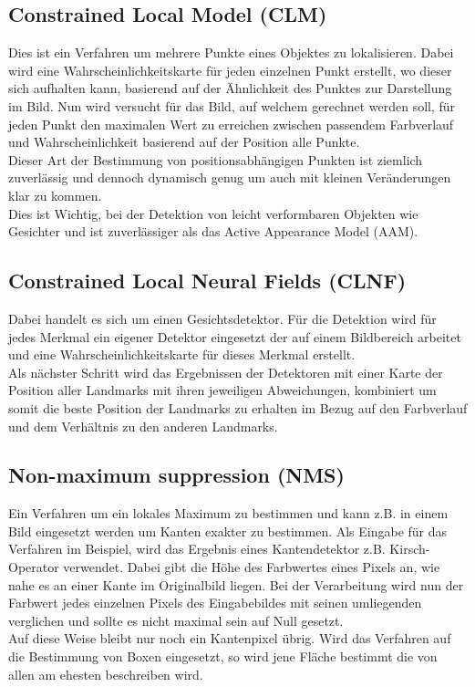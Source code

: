 \subsection{Constrained Local Model (CLM)}
Dies ist ein Verfahren um mehrere Punkte eines Objektes zu lokalisieren. Dabei wird eine Wahrscheinlichkeitskarte für jeden einzelnen Punkt erstellt, wo dieser sich aufhalten kann, basierend auf der Ähnlichkeit des Punktes zur Darstellung im Bild. Nun wird versucht für das Bild, auf welchem gerechnet werden soll, für jeden Punkt den maximalen Wert zu erreichen zwischen passendem Farbverlauf und Wahrscheinlichkeit basierend auf der Position alle Punkte.\\
Dieser Art der Bestimmung von positionsabhängigen Punkten ist ziemlich zuverlässig und dennoch dynamisch genug um auch mit kleinen Veränderungen klar zu kommen.\\
Dies ist Wichtig, bei der Detektion von leicht verformbaren Objekten wie Gesichter und ist zuverlässiger als das Active Appearance Model (AAM).\\
\cite{pdf_CLM}
\subsection{Constrained Local Neural Fields (CLNF)}
Dabei handelt es sich um einen Gesichtsdetektor. Für die Detektion wird für jedes Merkmal ein eigener Detektor eingesetzt der auf einem Bildbereich arbeitet und eine Wahrscheinlichkeitskarte für dieses Merkmal erstellt.\\
Als nächster Schritt wird das Ergebnissen der Detektoren mit einer Karte der Position aller Landmarks mit ihren jeweiligen Abweichungen, kombiniert um somit die beste Position der Landmarks zu erhalten im Bezug auf den Farbverlauf und dem Verhältnis zu den anderen Landmarks.\\
\cite{CLNF}
\subsection{Non-maximum suppression  (NMS)}
Ein Verfahren um ein lokales Maximum zu bestimmen und kann z.B. in einem Bild eingesetzt werden um Kanten exakter zu bestimmen. Als Eingabe für das Verfahren im Beispiel, wird das Ergebnis eines Kantendetektor z.B. Kirsch-Operator verwendet. Dabei gibt die Höhe des Farbwertes eines Pixels an, wie nahe es an einer Kante im Originalbild liegen. Bei der Verarbeitung wird nun der Farbwert jedes einzelnen Pixels des Eingabebildes mit seinen umliegenden verglichen und sollte es nicht maximal sein auf Null gesetzt.\\
Auf diese Weise bleibt nur noch ein Kantenpixel übrig. Wird das Verfahren auf die Bestimmung von Boxen eingesetzt, so wird jene Fläche bestimmt die von allen am ehesten beschreiben wird.\\
\cite{NMS}\cite{wiki_Canny}
